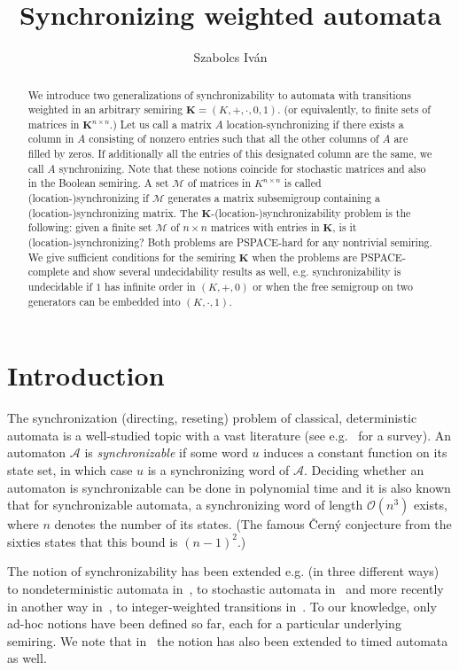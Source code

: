 \documentclass[submission,copyright,creativecommons]{eptcs}
\title{Synchronizing weighted automata}
\author{Szabolcs Iv\'an
\institute{University of Szeged, Hungary}
\email{szabivan@inf.u-szeged.hu}
}
\def\bK{{\mathbf{K}}}
\theoremstyle{plain}
\theoremstyle{definition}
\theoremstyle{remark}
\begin{document}
\maketitle

\begin{abstract}
We introduce two generalizations of synchronizability to automata with transitions weighted in an arbitrary semiring $\bK=(K,+,\cdot,0,1)$.
(or equivalently, to finite sets of matrices in $\bK^{n\times n}$.)
Let us call a matrix $A$ location-synchronizing if there exists a column in $A$ consisting of nonzero entries such that all the other columns of $A$ are filled by zeros.
If additionally all the entries of this designated column are the same, we call $A$ synchronizing.
Note that these notions coincide for stochastic matrices and also in the Boolean semiring.
A set $\mathcal{M}$ of matrices in $K^{n\times n}$ is called (location-)synchronizing if $\mathcal{M}$ generates a matrix subsemigroup containing a (location-)synchronizing matrix.
The $\bK$-(location-)synchronizability problem is the following: given a finite set $\mathcal{M}$ of $n\times n$ matrices with entries in $\bK$,
is it (location-)synchronizing? 
Both problems are PSPACE-hard for any nontrivial semiring.
We give sufficient conditions for the semiring $\bK$ when the problems are PSPACE-complete and show several undecidability results as well, e.g. synchronizability is undecidable if $1$ has infinite order in $(K,+,0)$ or when the free semigroup on two generators can be embedded into $(K,\cdot,1)$.
\end{abstract}

\section{Introduction}

The synchronization (directing, reseting) problem of classical, deterministic automata is a well-studied topic with a vast literature (see e.g.~\cite{volkov} for a survey). An automaton $\mathcal{A}$ is \emph{synchronizable} if some word $u$ induces a constant function on its state set, in which case $u$ is a synchronizing word of $\mathcal{A}$.
Deciding whether an automaton is synchronizable can be done in polynomial time and it is also known that for synchronizable automata, a synchronizing word of length $\mathcal{O}(n^3)$ exists, where $n$ denotes the number of its states.
(The famous \v{C}ern\'y conjecture from the sixties states that this bound is $(n-1)^2$.)

The notion of synchronizability has been extended e.g. (in three different ways) to nondeterministic automata in~\cite{imreh}, to stochastic automata in~\cite{kfouri} and more recently in another way in~\cite{doyen}, to integer-weighted transitions in~\cite{larsen}.
To our knowledge, only ad-hoc notions have been defined so far, each for a particular underlying semiring.
We note that in~\cite{larsen} the notion has also been extended to timed automata as well.
\end{document}
